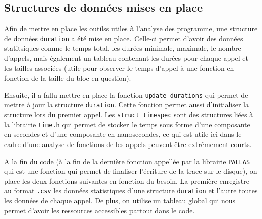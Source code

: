 


\subsection{Structures de données mises en place}\label{ssec:details_durations}

Afin de mettre en place les outilss utiles à l'analyse des programme, une structure de données \verb!duration! a été mise en place.
Celle-ci permet d'avoir des données statitsiques comme le temps total, les durées minimale, maximale, le nombre d'appels, mais également un tableau contenant les durées pour chaque appel et les tailles associées
(utile pour observer le temps d'appel à une fonction en fonction de la taille du bloc en question).


Ensuite, il a fallu mettre en place la fonction \verb!update_durations! qui permet de mettre à jour la structure \verb!duration!. Cette fonction permet aussi d'initialiser la structure
lors du premier appel.
Les \verb!struct timespec! sont des structures liées à la librairie \verb!time.h! qui permet de stocker le temps sous forme d'une composante en secondes et d'une composante en nanosecondes, 
ce qui est utile ici dans le cadre d'une analyse de fonctions de les appels peuvent être extrêmement courts.


A la fin du code (à la fin de la dernière fonction appellée par la librairie \verb!PALLAS! qui est une fonction qui permet de finaliser l'écriture de la trace sur le disque), 
on place les deux fonctions suivantes en fonction du besoin. La première enregistre au format
\verb!.csv! les données statistiques d'une structure \verb!duration! et l'autre toutes les données de chaque appel.
De plus, on utilise un tableau global qui nous permet d'avoir les ressources accessibles partout dans le code.


